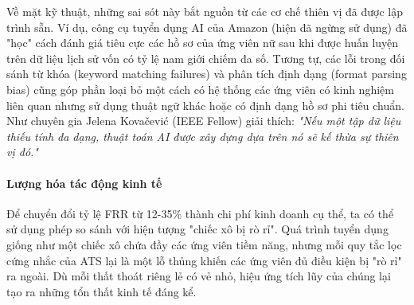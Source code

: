 \documentclass{article}
\begin{document}
Về mặt kỹ thuật, những sai sót này bắt nguồn từ các cơ chế thiên vị đã được lập trình sẵn. Ví dụ, công cụ tuyển dụng AI của Amazon (hiện đã ngừng sử dụng) đã "học" cách đánh giá tiêu cực các hồ sơ của ứng viên nữ sau khi được huấn luyện trên dữ liệu lịch sử vốn có tỷ lệ nam giới chiếm đa số. Tương tự, các lỗi trong đối sánh từ khóa (keyword matching failures) và phân tích định dạng (format parsing bias) cũng góp phần loại bỏ một cách có hệ thống các ứng viên có kinh nghiệm liên quan nhưng sử dụng thuật ngữ khác hoặc có định dạng hồ sơ phi tiêu chuẩn. Như chuyên gia Jelena Kovačević (IEEE Fellow) giải thích: \textit{"Nếu một tập dữ liệu thiếu tính đa dạng, thuật toán AI được xây dựng dựa trên nó sẽ kế thừa sự thiên vị đó."}

\paragraph{Lượng hóa tác động kinh tế}
Để chuyển đổi tỷ lệ FRR từ 12-35\% thành chi phí kinh doanh cụ thể, ta có thể sử dụng phép so sánh với hiện tượng "chiếc xô bị rò rỉ". Quá trình tuyển dụng giống như một chiếc xô chứa đầy các ứng viên tiềm năng, nhưng mỗi quy tắc lọc cứng nhắc của ATS lại là một lỗ thủng khiến các ứng viên đủ điều kiện bị "rò rỉ" ra ngoài. Dù mỗi thất thoát riêng lẻ có vẻ nhỏ, hiệu ứng tích lũy của chúng lại tạo ra những tổn thất kinh tế đáng kể.
\end{document}

